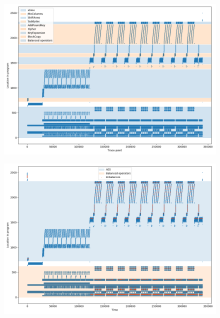 \documentclass[11pt,t,usepdftitle=false,aspectratio=169]{beamer}
\begin{document}
\begin{frame}
  \begin{figure}
    \centering
    \includegraphics[height=\textheight]{aes-parts.png}
  \end{figure}
\end{frame}

\begin{frame}
  \begin{figure}
    \centering
    \includegraphics[height=\textheight]{imbalances-0.png}
  \end{figure}
\end{frame}
\end{document}
